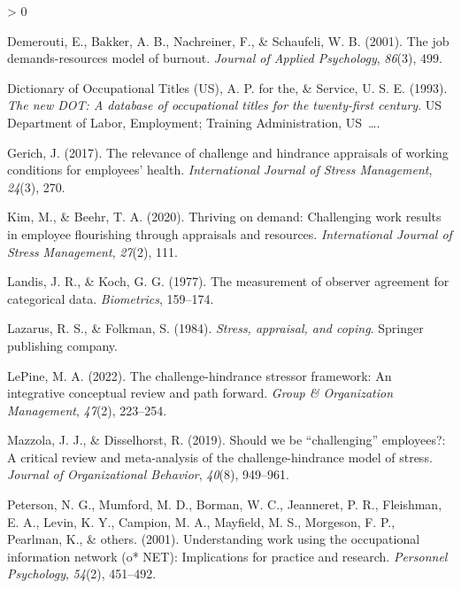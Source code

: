 \documentclass[
  english,
  man]{apa6}
\newlength{\cslhangindent}
\newenvironment{CSLReferences}[2] %
 {%
  \setlength{\parindent}{0pt}
  \ifodd #1 \everypar{\setlength{\hangindent}{\cslhangindent}}\ignorespaces\fi
  \ifnum #2 > 0
  \setlength{\parskip}{#2\baselineskip}
  \fi
 }%
 {}
\begin{document}
\begin{CSLReferences}{1}{0}
\leavevmode\hypertarget{ref-demerouti2001job}{}%
Demerouti, E., Bakker, A. B., Nachreiner, F., \& Schaufeli, W. B. (2001). The job demands-resources model of burnout. \emph{Journal of Applied Psychology}, \emph{86}(3), 499.

\leavevmode\hypertarget{ref-advisory1993new}{}%
Dictionary of Occupational Titles (US), A. P. for the, \& Service, U. S. E. (1993). \emph{The new DOT: A database of occupational titles for the twenty-first century}. US Department of Labor, Employment; Training Administration, US~\ldots.

\leavevmode\hypertarget{ref-gerich2017relevance}{}%
Gerich, J. (2017). The relevance of challenge and hindrance appraisals of working conditions for employees' health. \emph{International Journal of Stress Management}, \emph{24}(3), 270.

\leavevmode\hypertarget{ref-kim2020thriving}{}%
Kim, M., \& Beehr, T. A. (2020). Thriving on demand: Challenging work results in employee flourishing through appraisals and resources. \emph{International Journal of Stress Management}, \emph{27}(2), 111.

\leavevmode\hypertarget{ref-landis1977measurement}{}%
Landis, J. R., \& Koch, G. G. (1977). The measurement of observer agreement for categorical data. \emph{Biometrics}, 159--174.

\leavevmode\hypertarget{ref-lazarus1984stress}{}%
Lazarus, R. S., \& Folkman, S. (1984). \emph{Stress, appraisal, and coping}. Springer publishing company.

\leavevmode\hypertarget{ref-lepine2022challenge}{}%
LePine, M. A. (2022). The challenge-hindrance stressor framework: An integrative conceptual review and path forward. \emph{Group \& Organization Management}, \emph{47}(2), 223--254.

\leavevmode\hypertarget{ref-mazzola2019should}{}%
Mazzola, J. J., \& Disselhorst, R. (2019). Should we be {``challenging''} employees?: A critical review and meta-analysis of the challenge-hindrance model of stress. \emph{Journal of Organizational Behavior}, \emph{40}(8), 949--961.

\leavevmode\hypertarget{ref-peterson2001understanding}{}%
Peterson, N. G., Mumford, M. D., Borman, W. C., Jeanneret, P. R., Fleishman, E. A., Levin, K. Y., Campion, M. A., Mayfield, M. S., Morgeson, F. P., Pearlman, K., \& others. (2001). Understanding work using the occupational information network (o* NET): Implications for practice and research. \emph{Personnel Psychology}, \emph{54}(2), 451--492.


\end{CSLReferences}
\end{document}
